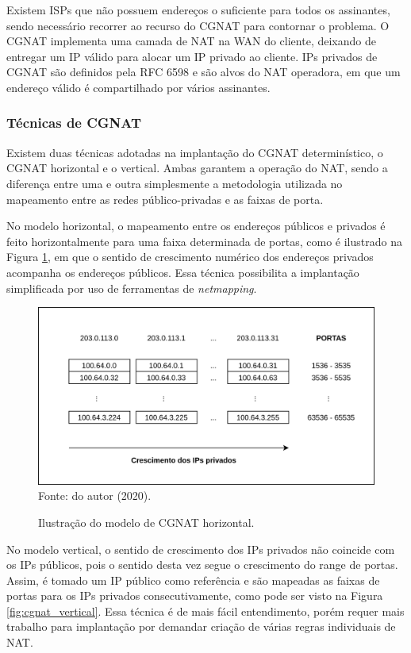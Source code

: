     Existem ISPs que não possuem endereços o suficiente para todos os assinantes, sendo necessário recorrer ao recurso do CGNAT para contornar o problema. O CGNAT implementa uma camada de NAT na WAN do cliente, deixando de entregar um IP válido para alocar um IP privado ao cliente. IPs privados de CGNAT são definidos pela RFC 6598 e são alvos do NAT  operadora, em que um endereço válido é compartilhado por vários assinantes.

\subsubsection{Técnicas de CGNAT}

    Existem duas técnicas adotadas na implantação do CGNAT determinístico, o CGNAT horizontal e o vertical. Ambas garantem a operação do NAT, sendo a diferença entre uma e outra simplesmente a metodologia utilizada no mapeamento entre as redes público-privadas e as faixas de porta.
    
    No modelo horizontal, o mapeamento entre os endereços públicos e privados é feito horizontalmente para uma faixa determinada de portas, como é ilustrado na Figura \ref{fig:cgnat_horizontal}, em que o sentido de crescimento numérico dos endereços privados acompanha os endereços públicos. Essa técnica possibilita a implantação simplificada por uso de ferramentas de \textit{netmapping}.
    
    \begin{figure}[!htb]
        \centering
        \caption{Ilustração do modelo de CGNAT horizontal.} 
        \label{fig:cgnat_horizontal} 
        \includegraphics[width=0.9\linewidth]{img/CGNAT-Horizontal.png} \\
        {\small Fonte: do autor (2020).} 
    \end{figure}
    
    No modelo vertical, o sentido de crescimento dos IPs privados não coincide com os IPs públicos, pois o sentido desta vez segue o crescimento do range de portas. Assim, é tomado um IP público como referência e são mapeadas as faixas de portas para os IPs privados consecutivamente, como pode ser visto na Figura \ref{fig:cgnat_vertical}. Essa técnica é de mais fácil entendimento, porém requer mais trabalho para implantação por demandar criação de várias regras individuais de NAT.
    
